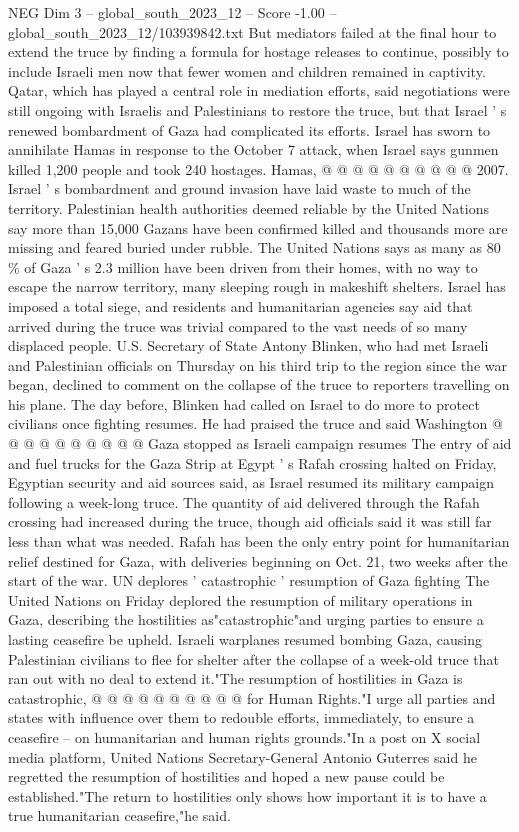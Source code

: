 \begin{textsample}{NEG Dim 3 – global\_south\_2023\_12 – Score -1.00 – global\_south\_2023\_12/103939842.txt}
But mediators failed at the final hour to extend the truce by finding a formula for hostage releases to continue, possibly to include Israeli men now that fewer women and children remained in captivity.
Qatar, which has played a central role in mediation efforts, said negotiations were still ongoing with Israelis and Palestinians to restore the truce, but that Israel ' s renewed bombardment of Gaza had complicated its efforts.
Israel has sworn to annihilate Hamas in response to the October 7 attack, when Israel says gunmen killed 1,200 people and took 240 hostages.
Hamas, @ @ @ @ @ @ @ @ @ @ 2007.
Israel ' s bombardment and ground invasion have laid waste to much of the territory.
Palestinian health authorities deemed reliable by the United Nations say more than 15,000 Gazans have been confirmed killed and thousands more are missing and feared buried under rubble.
The United Nations says as many as 80 \% of Gaza ' s 2.3 million have been driven from their homes, with no way to escape the narrow territory, many sleeping rough in makeshift shelters.
Israel has imposed a total siege, and residents and humanitarian agencies say aid that arrived during the truce was trivial compared to the vast needs of so many displaced people.
U.S.
Secretary of State Antony Blinken, who had met Israeli and Palestinian officials on Thursday on his third trip to the region since the war began, declined to comment on the collapse of the truce to reporters travelling on his plane.
The day before, Blinken had called on Israel to do more to protect civilians once fighting resumes.
He had praised the truce and said Washington @ @ @ @ @ @ @ @ @ @ Gaza stopped as Israeli campaign resumes The entry of aid and fuel trucks for the Gaza Strip at Egypt ' s Rafah crossing halted on Friday, Egyptian security and aid sources said, as Israel resumed its military campaign following a week-long truce.
The quantity of aid delivered through the Rafah crossing had increased during the truce, though aid officials said it was still far less than what was needed.
Rafah has been the only entry point for humanitarian relief destined for Gaza, with deliveries beginning on Oct. 21, two weeks after the start of the war.
UN deplores ' catastrophic ' resumption of Gaza fighting The United Nations on Friday deplored the resumption of military operations in Gaza, describing the hostilities as"catastrophic"and urging parties to ensure a lasting ceasefire be upheld.
Israeli warplanes resumed bombing Gaza, causing Palestinian civilians to flee for shelter after the collapse of a week-old truce that ran out with no deal to extend it."The resumption of hostilities in Gaza is catastrophic, @ @ @ @ @ @ @ @ @ @ for Human Rights."I urge all parties and states with influence over them to redouble efforts, immediately, to ensure a ceasefire -- on humanitarian and human rights grounds."In a post on X social media platform, United Nations Secretary-General Antonio Guterres said he regretted the resumption of hostilities and hoped a new pause could be established."The return to hostilities only shows how important it is to have a true humanitarian ceasefire,"he said.

\end{textsample}
